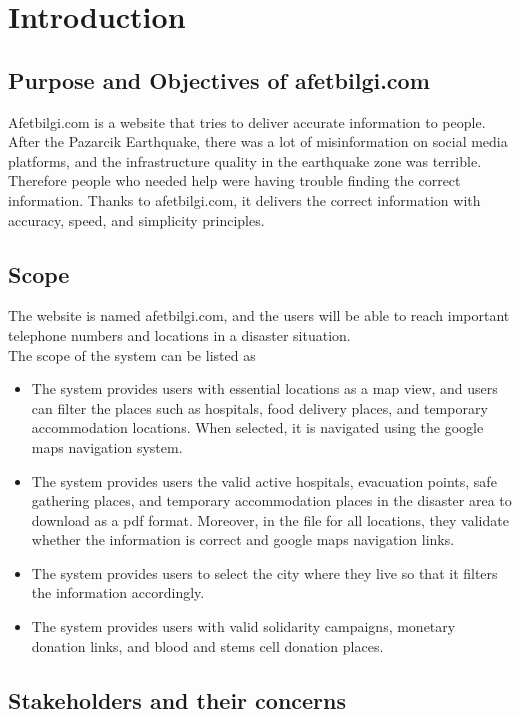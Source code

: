 \chapter{Introduction}

\section{Purpose and Objectives of afetbilgi.com}

Afetbilgi.com is a website that tries to deliver accurate information to people.
After the Pazarcik Earthquake, there was a lot of misinformation on social media platforms, and the infrastructure quality in the earthquake zone was terrible. 
Therefore people who needed help were having trouble finding the correct information.
Thanks to afetbilgi.com, it delivers the correct information with accuracy, speed, and simplicity principles.

\section{Scope}

The website is named afetbilgi.com, and the users will be able to reach important telephone numbers and locations in a disaster situation. \\
The scope of the system can be listed as \\
\begin{itemize}
    \item The system provides users with essential locations as a map view, and users can filter the places such as hospitals, food delivery places, and temporary accommodation locations. When selected, it is navigated using the google maps navigation system.
    \item The system provides users the valid active hospitals, evacuation points, safe gathering places, and temporary accommodation places in the disaster area to download as a pdf format. Moreover, in the file for all locations, they validate whether the information is correct and google maps navigation links.
    \item The system provides users to select the city where they live so that it filters the information accordingly.
    \item The system provides users with valid solidarity campaigns, monetary donation links, and blood and stems cell donation places. 
\end{itemize}

\section{Stakeholders and their concerns}

